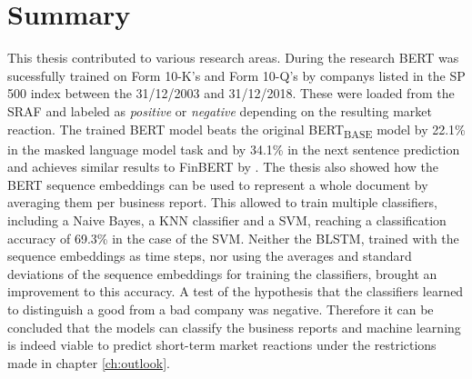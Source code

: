 \chapter{Summary}\label{ch:summary}

This thesis contributed to various research areas.
During the research \ac{BERT} was sucessfully trained on Form 10-K's and Form 10-Q's by companys listed in the \ac{SP} 500 index between the 31/12/2003 and 31/12/2018.
These were loaded from the \ac{SRAF} and labeled as \textit{positive} or \textit{negative} depending on the resulting market reaction.
The trained \ac{BERT} model beats the original BERT\textsubscript{BASE} model by 22.1\% in the masked language model task and by 34.1\% in the next sentence prediction and achieves similar results to FinBERT by \cite{DeSola2019}.
The thesis also showed how the \ac{BERT} sequence embeddings can be used to represent a whole document by averaging them per business report.
This allowed to train multiple classifiers, including a Naive Bayes, a \ac{KNN} classifier and a \ac{SVM}, reaching a classification accuracy of 69.3\% in the case of the \ac{SVM}.
Neither the \ac{BLSTM}, trained with the sequence embeddings as time steps, nor using the averages and standard deviations of the sequence embeddings for training the classifiers, brought an improvement to this accuracy.
A test of the hypothesis that the classifiers learned to distinguish a good from a bad company was negative.
Therefore it can be concluded that the models can classify the business reports and machine learning is indeed viable to predict short-term market reactions under the restrictions made in chapter \ref{ch:outlook}.

